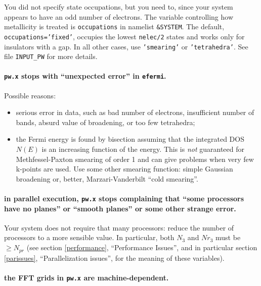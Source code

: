 \documentclass[12pt,a4paper]{article}
\begin{document}
You did not specify state occupations, but you need to, since your
system appears to have an odd number of electrons.
The variable controlling how metallicity is treated is
\texttt{occupations} in namelist \texttt{\&SYSTEM}.
The default, \texttt{occupations='fixed'}, occupies the lowest
\texttt{nelec/2} states and works only for insulators with a gap.
In all other cases, use \texttt{'smearing'} or \texttt{'tetrahedra'}.
See file \texttt{INPUT\_PW} for more details.

\paragraph{\texttt{pw.x} stops with ``unexpected error'' in
           \texttt{efermi}.}

Possible reasons:
\begin{itemize}
  \item
    serious error in data, such as bad number of electrons,
    insufficient number of bands, absurd value of broadening, or too
    few tetrahedra;
  \item
    the Fermi energy is found by bisection assuming that the
    integrated DOS $N(E)$ is an increasing function of the energy. 
    This is {\em not} guaranteed for Methfessel-Paxton smearing of
    order 1 and can give problems when very few k-points are used.
    Use some other smearing function: simple Gaussian broadening or,
    better, Marzari-Vanderbilt ``cold smearing''.
\end{itemize}

\paragraph{in parallel execution, \texttt{pw.x} stops complaining that
           ``some processors have no planes'' or ``smooth planes'' or
           some other strange error.}

Your system does not require that many processors: reduce the number
of processors to a more sensible value.
In particular, both $N_3$ and $Nr_3$ must be $\geq N_{pr}$ (see
section \ref{performance}, ``Performance Issues'', and in particular
section \ref{parissues}, ``Parallelization issues'', for the meaning
of these variables).

\paragraph{the FFT grids in \texttt{pw.x} are machine-dependent.}
\end{document}
